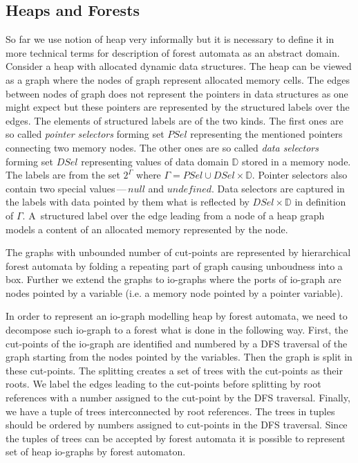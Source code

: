 \documentclass[a4paper, 12pt]{article}
\begin{document}
\subsection{Heaps and Forests}
So far we use notion of heap very informally but it is necessary to define
it in more technical terms for description of forest automata as an abstract domain.
Consider a heap with allocated dynamic data structures.
The heap can be viewed as a graph where the nodes of graph represent
allocated memory cells.
The edges between nodes of graph does not represent the pointers in data structures
as one might expect but these pointers are represented by the structured labels over the edges.
The elements of structured labels are of the two kinds.
The first ones are so called \emph{pointer selectors} forming set $PSel$ representing
the mentioned pointers connecting two memory nodes.
The other ones are so called \emph{data selectors} forming set $DSel$ representing
values of data domain $\mathbb{D}$ stored in a memory node.
The labels are from the set $2^\Gamma$ where $\Gamma = PSel \cup DSel \times \mathbb{D}$.
Pointer selectors also contain two special values\,---\,$null$ and $undefined$.
Data selectors are captured in the labels with data pointed by them what
is reflected by $DSel \times \mathbb{D}$ in definition of $\Gamma$.
A~structured label over the edge leading from a node of a heap graph
models a content of an allocated memory represented by the node.

The graphs with unbounded number of cut-points are represented by hierarchical
forest automata by folding a repeating part of graph causing unboudness into a box.
Further we extend the graphs to io-graphs where the ports of io-graph are nodes pointed
by a variable (i.e. a memory node pointed by a pointer variable).

In order to represent an io-graph modelling heap by forest automata,
we need to decompose such io-graph to a forest what is done in the following way.
First, the cut-points of the io-graph are identified and numbered by
a DFS traversal of the graph starting from the nodes pointed by the variables.
Then the graph is split in these cut-points.
The splitting creates a set of trees with the cut-points as their roots.
We label the edges leading to the cut-points before splitting by root
references with a number assigned to the cut-point by the DFS traversal.
Finally, we have a tuple of trees interconnected by root references.
The trees in tuples should be ordered by numbers assigned to cut-points in the DFS traversal.
Since the tuples of trees can be accepted by forest automata it is
possible to represent set of heap io-graphs by forest automaton.
\end{document}
